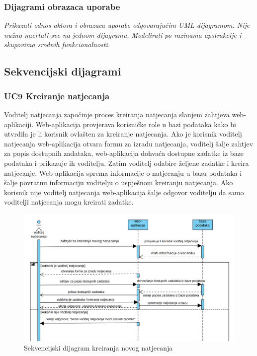 					
				\subsubsection{Dijagrami obrazaca uporabe}
					
					\textit{Prikazati odnos aktora i obrazaca uporabe odgovarajućim UML dijagramom. Nije nužno nacrtati sve na jednom dijagramu. Modelirati po razinama apstrakcije i skupovima srodnih funkcionalnosti.}
				\eject
				
			\subsection{Sekvencijski dijagrami}

				\vspace{10mm}
				\subsubsection*{UC9 Kreiranje natjecanja}
				
				Voditelj natjecanja započinje proces kreiranja natjecanja slanjem zahtjeva web-aplikaciji. Web-aplikacija provjerava korisničke role u bazi podataka kako bi utvrdila je li korisnik ovlašten za kreiranje natjecanja. Ako je korisnik voditelj natjecanja web-aplikacija otvara formu za izradu natjecanja, voditelj šalje zahtjev za popis dostupnih zadataka, web-aplikacija dohvaća dostupne zadatke iz baze podataka i prikazuje ih voditelju. Zatim voditelj odabire željene zadatke i kreira natjecanje. Web-aplikacija sprema informacije o natjecanju u bazu podataka i šalje povratnu informaciju voditelju o uspješnom kreiranju natjecanja. Ako korisnik nije voditelj natjecanja web-aplikacija šalje odgovor voditelju da samo voditelji natjecanja mogu kreirati zadatke.
				\vspace{20mm}
				
				\begin{figure}[htbp]
					\centering
					\includegraphics[width=\linewidth]{slike/kreiranje_natjecanja.png}
					\caption{Sekvencijski dijagram kreiranja novog natjecanja}\label{fig:seqdiag_natjecanja}
				\end{figure}
				
